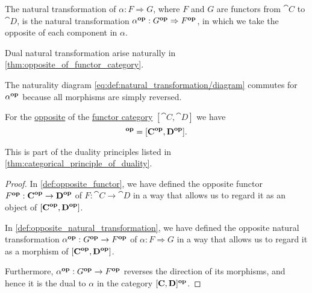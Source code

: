 \begin{definition}\label{def:opposite_natural_transformation}\mimprovised
  The  natural transformation of \( \alpha: F \Rightarrow G \), where \( F \) and \( G \) are functors from \( \cat{C} \) to \( \cat{D} \), is the natural transformation \( \alpha^\oppos: G^\oppos \Rightarrow F^\oppos \), in which we take the opposite of each component in \( \alpha \).

  Dual natural transformation arise naturally in \cref{thm:opposite_of_functor_category}.
\end{definition}
\begin{defproof}
  The naturality diagram \eqref{eq:def:natural_transformation/diagram} commutes for \( \alpha^\oppos \) because all morphisms are simply reversed.
\end{defproof}

\begin{proposition}\label{thm:opposite_of_functor_category}
  For the \hyperref[def:opposite_category]{opposite} of the \hyperref[def:functor_category]{functor category} \( [\cat{C}, \cat{D}] \) we have
  \begin{equation*}
    [\cat{C}, \cat{D}]^\oppos = [\cat{C}^\oppos, \cat{D}^\oppos].
  \end{equation*}

  This is part of the duality principles listed in \cref{thm:categorical_principle_of_duality}.
\end{proposition}
\begin{proof}
  In \cref{def:opposite_functor}, we have defined the opposite functor \( F^\oppos: \cat{C}^\oppos \to \cat{D}^\oppos \) of \( F: \cat{C} \to \cat{D} \) in a way that allows us to regard it as an object of \( [\cat{C}^\oppos, \cat{D}^\oppos] \).

  In \cref{def:opposite_natural_transformation}, we have defined the opposite natural transformation \( \alpha^\oppos: G^\oppos \to F^\oppos \) of \( \alpha: F \Rightarrow G \) in a way that allows us to regard it as a morphism of \( [\cat{C}^\oppos, \cat{D}^\oppos] \).

  Furthermore, \( \alpha^\oppos: G^\oppos \to F^\oppos \) reverses the direction of its morphisms, and hence it is the dual to \( \alpha \) in the category \( [\cat{C}, \cat{D}]^\oppos \).
\end{proof}

